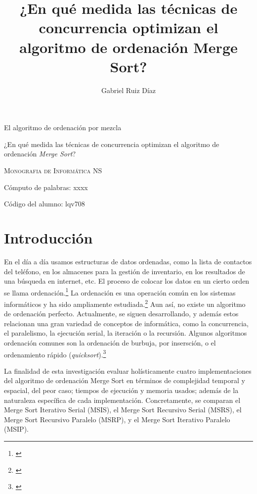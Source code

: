 \documentclass[titlepage]{article}
\title{¿En qué medida las técnicas de concurrencia optimizan el algoritmo de ordenación Merge Sort?}
\author{Gabriel Ruiz Díaz}
\date{}
\begin{document}
	
	
\begin{titlepage}
\centering
{\hfill}
\vspace{3cm}

{\Huge El algoritmo de ordenación por mezcla\par}
\vspace{2cm}
{\LARGE ¿En qué medida las técnicas de concurrencia optimizan el algoritmo de ordenación \textit{Merge Sort}? \par}
\vspace{1cm}
{\scshape\large Monografia de Informática NS \par}
\vspace{8cm}


{\Large Cómputo de palabras: xxxx \par}
{\Large Código del alumno: lqv708 \par}
\end{titlepage}

\newpage
\tableofcontents

\newpage
\section{Introducción} %
En el día a día usamos estructuras de datos ordenadas, como la lista de contactos del teléfono, en los almacenes para la gestión de inventario, en los resultados de una búsqueda en internet, etc. El proceso de colocar los datos en un cierto orden se llama ordenación.\footnote{\cite{knuth-1997}} La ordenación es una operación común en los sistemas informáticos y ha sido ampliamente estudiada.\footnote{\cite{McMillan-2007}} Aun así, no existe un algoritmo de ordenación perfecto. Actualmente, se siguen desarrollando, y además estos relacionan una gran variedad de conceptos de informática, como la concurrencia, el paralelismo, la ejecución serial, la iteración o la recursión.
Algunos algoritmos ordenación comunes son la ordenación de burbuja, por insersción, o el ordenamiento rápido (\textit{quicksort}).\footnote{\cite{pandey2008study}}


La finalidad de esta investigación evaluar holísticamente cuatro implementaciones del algoritmo de ordenación Merge Sort en términos de complejidad temporal y espacial, del peor caso; tiempos de ejecución y memoria usados; además de la naturaleza específica de cada implementación. Concretamente, se comparan el Merge Sort Iterativo Serial (MSIS), el Merge Sort Recursivo Serial (MSRS), el Merge Sort Recursivo Paralelo (MSRP), y el Merge Sort Iterativo Paralelo (MSIP).
\end{document}
